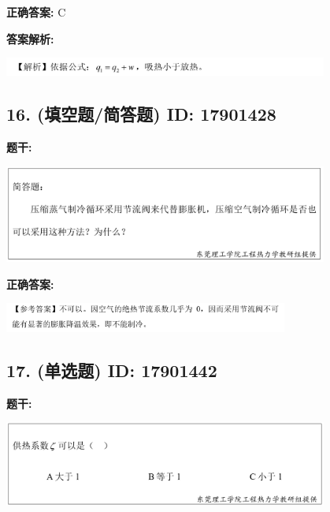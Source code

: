 \documentclass[12pt]{article}
\begin{document}
\textbf{正确答案:}
C

\textbf{答案解析:}


\begin{center}\includegraphics[width=0.8\textwidth, height=0.25\textheight, keepaspectratio]{question_15_17901444/correct_replay_img_1.png}\end{center}

\vspace{0.5em}\hrulefill\vspace{1em}

\subsection*{16. (填空题/简答题) \small ID: 17901428}

\textbf{题干:}


\begin{center}\includegraphics[width=0.8\textwidth, height=0.25\textheight, keepaspectratio]{question_16_17901428/title_img_1.png}\end{center}

\textbf{正确答案:}

\begin{center}\includegraphics[width=0.7\textwidth, height=0.2\textheight, keepaspectratio]{question_16_17901428/correct_answer_1_img_1.png}\end{center}

\vspace{0.5em}\hrulefill\vspace{1em}

\subsection*{17. (单选题) \small ID: 17901442}

\textbf{题干:}


\begin{center}\includegraphics[width=0.8\textwidth, height=0.25\textheight, keepaspectratio]{question_17_17901442/title_img_1.png}\end{center}
\end{document}
